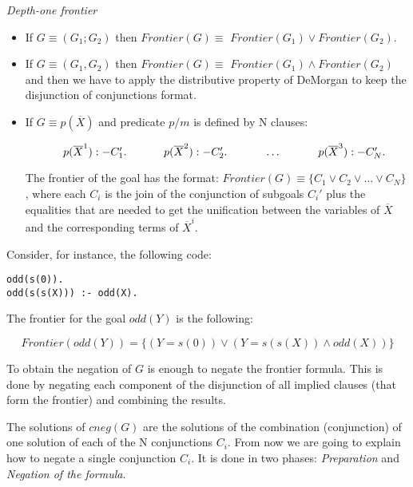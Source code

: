 \documentclass{llncs}
\begin{document}
\begin{definition}{\em Depth-one frontier}

    \begin{itemize} 

\item If $G \equiv (G_1;G_2) $ then $Frontier(G) \equiv$
$Frontier(G_1) \vee Frontier(G_2)$.

\item If $G \equiv (G_1,G_2) $ then $Frontier(G) \equiv$
  $Frontier(G_1) \wedge Frontier(G_2)$ and then we have to apply the
  distributive property of DeMorgan to keep the disjunction of
  conjunctions format.
  
\item If $G \equiv p( \overline{X}) $ and 
  predicate $p/m$ is defined by N clauses:

$
~~~~~~~~~~p( \overline{X}^1):- C_1'. \\
~~~~~~~~~~p( \overline{X}^2):- C_2'. \\
~~~~~~~~~~\ldots \\
~~~~~~~~~~p( \overline{X}^3):- C_N'. \\
$

The frontier of the goal has the format:
$Frontier(G) \equiv \{C_1 \vee C_2 \vee \ldots \vee C_N\}$, 
where each $C_i$ is the join
of the conjunction of subgoals $C_i'$ plus the equalities that are
needed to get the unification between the variables of $\overline{X}$
and the corresponding terms of $\overline{X}^i$.

    \end{itemize}

\end{definition}

\noindent
Consider, for instance, the following code:

\begin{verbatim}
odd(s(0)).
odd(s(s(X))) :- odd(X).
\end{verbatim}

The frontier for the goal $odd (Y)$ is the following:

\[Frontier(odd(Y)) = \{ ( Y=s(0) ) \vee ( Y=s(s(X)) \wedge odd(X) ) \} \] 

To obtain the negation of $G$ is enough to negate the frontier
formula. This is done by negating each component of the disjunction of
all implied clauses (that form the frontier) and combining the
results.


The solutions of $cneg(G)$ are the solutions of the combination
(conjunction) of one solution of each of the N conjunctions
$C_i$. From now we are going to explain how to negate a single
conjunction $C_i$. It is done in two phases: \emph{Preparation} and
\emph{Negation of the formula}.
\end{document}
